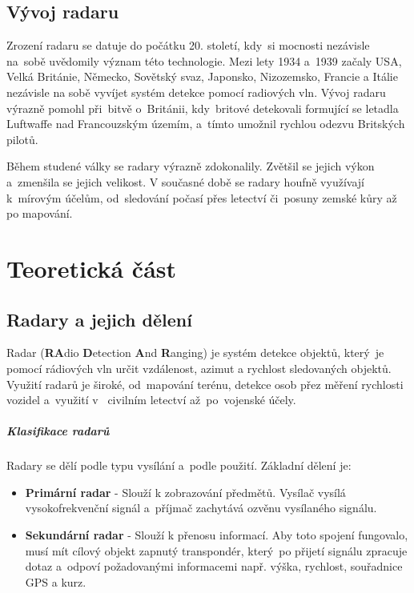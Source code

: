 	\section{Vývoj radaru}
		Zrození radaru se datuje do počátku 20. století, kdy~si mocnosti nezávisle na~sobě uvědomily význam této technologie. Mezi lety 1934 a~1939 začaly USA, Velká Británie, Německo, Sovětský svaz, Japonsko, Nizozemsko, Francie a Itálie nezávisle na sobě vyvíjet systém detekce pomocí radiových vln.\cite{history::radar} Vývoj radaru výrazně pomohl při~bitvě o~Británii, kdy~britové detekovali formující se letadla Luftwaffe nad Francouzským územím, a~tímto umožnil rychlou odezvu Britských pilotů.\par
			
		Během studené války se radary výrazně zdokonalily. Zvětšil se jejich výkon a~zmenšila se jejich velikost. V současné době se radary houfně využívají k~mírovým účelům, od~sledování počasí přes letectví či~posuny zemské kůry až po mapování.
\chapter{Teoretická část}
	
	\section{Radary a jejich dělení}\label{uvod::radary}
		Radar (\textbf{RA}dio \textbf{D}etection \textbf{A}nd \textbf{R}anging) je systém detekce objektů, který~je pomocí rádiových vln určit vzdálenost, azimut a rychlost sledovaných objektů. Využití radarů je široké, od~mapování terénu, detekce osob přez měření rychlosti vozidel a~využití v ~civilním letectví až~po~vojenské účely.	
			
	\paragraph{Klasifikace radarů}
			Radary se dělí podle typu vysílání a~podle použití\cite{radarClasification}. Základní dělení je: 
			\begin{itemize}
				\item \textbf{Primární radar}	-	Slouží k zobrazování předmětů. Vysílač vysílá vysokofrekvenční signál a~příjmač zachytává ozvěnu vysílaného signálu.
					
				\item \textbf{Sekundární radar}	-	Slouží k přenosu informací. Aby toto spojení fungovalo, musí mít cílový objekt zapnutý transpondér, který~po přijetí signálu zpracuje dotaz a~odpoví požadovanými informacemi např. výška, rychlost, souřadnice GPS a kurz. 
			\end{itemize}
			
